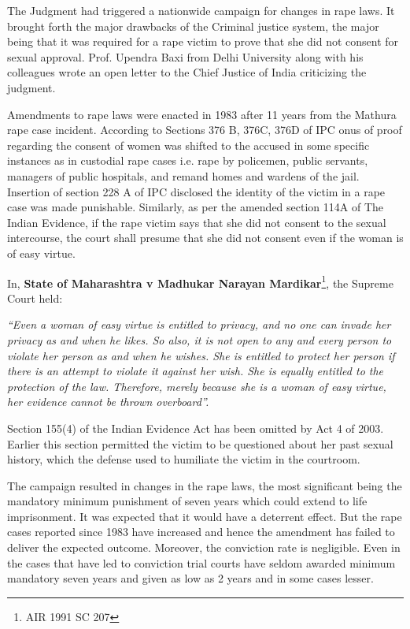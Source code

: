\begin{multicols}{2}
\noi
The Judgment had triggered a nationwide campaign for changes in rape laws. It brought
forth the major drawbacks of the Criminal justice system, the major being that it was
required for a rape victim to prove that she did not consent for sexual approval. Prof. Upendra Baxi from Delhi University along with his colleagues wrote an open letter to
the Chief Justice of India criticizing the judgment.

\vspace{-.1cm}

\noi
Amendments to rape laws were enacted in 1983 after 11 years from the Mathura rape
case incident. According to Sections 376 B, 376C, 376D of IPC onus of proof regarding
the consent of women was shifted to the accused in some specific instances as in
custodial rape cases i.e. rape by policemen, public servants, managers of public
hospitals, and remand homes and wardens of the jail. Insertion of section 228 A of IPC
disclosed the identity of the victim in a rape case was made punishable. Similarly, as
per the amended section 114A of The Indian Evidence, if the rape victim says that she
did not consent to the sexual intercourse, the court shall presume that she did not
consent even if the woman is of easy virtue.

\vspace{-.1cm}

\noi
In, {\bf State of Maharashtra v Madhukar Narayan Mardikar}\footnote{AIR 1991 SC 207}, the Supreme Court
held:

\vspace{-.1cm}

\noi
\textit{“Even a woman of easy virtue is entitled to privacy, and no one can invade her privacy
as and when he likes. So also, it is not open to any and every person to violate her
person as and when he wishes. She is entitled to protect her person if there is an attempt
to violate it against her wish. She is equally entitled to the protection of the law.
Therefore, merely because she is a woman of easy virtue, her evidence cannot be
thrown overboard”.}

\noi
Section 155(4) of the Indian Evidence Act has been omitted by Act 4 of 2003. Earlier
this section permitted the victim to be questioned about her past sexual history, which
the defense used to humiliate the victim in the courtroom.

\noi
The campaign resulted in changes in the rape laws, the most significant being the
mandatory minimum punishment of seven years which could extend to life
imprisonment. It was expected that it would have a deterrent effect. But the rape cases
reported since 1983 have increased and hence the amendment has failed to deliver the
expected outcome. Moreover, the conviction rate is negligible. Even in the cases that
have led to conviction trial courts have seldom awarded minimum mandatory seven
years and given as low as 2 years and in some cases lesser.


\end{multicols}
